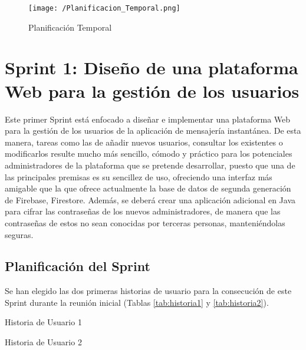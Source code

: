 \begin{figure}[!h]
	\begin{center}
		\texttt{[image: /Planificacion\_Temporal.png]}
		\caption{Planificación Temporal}
		\label{fig:plantempo}
	\end{center}
\end{figure}

\clearpage

\section{Sprint 1: Diseño de una plataforma Web para la gestión de los usuarios}
Este primer Sprint está enfocado a diseñar e implementar una plataforma Web para la gestión de los usuarios de la aplicación de mensajería instantánea. De esta manera, tareas como las de añadir nuevos usuarios, consultar los existentes o modificarlos resulte mucho más sencillo, cómodo y práctico para los potenciales administradores de la plataforma que se pretende desarrollar, puesto que una de las principales premisas es su sencillez de uso, ofreciendo una interfaz más amigable que la que ofrece actualmente la base de datos de segunda generación de Firebase, Firestore. Además, se deberá crear una aplicación adicional en Java para cifrar las contraseñas de los nuevos administradores, de manera que las contraseñas de estos no sean conocidas por terceras personas, manteniéndolas seguras.

\subsection{Planificación del Sprint}
Se han elegido las dos primeras historias de usuario para la consecución de este Sprint durante la reunión inicial (Tablas \ref{tab:historia1} y \ref{tab:historia2}).

\begin{table}[!htbp]
	\centering
	{\small
		
	}
	\caption[Historia de Usuario 1]
	{Historia de Usuario 1}
	\label{tab:historia1}
\end{table}

\begin{table}[!htbp]
	\centering
	{\small
		
	}
	\caption[Historia de Usuario 2]
	{Historia de Usuario 2}
	\label{tab:historia2}
\end{table}

